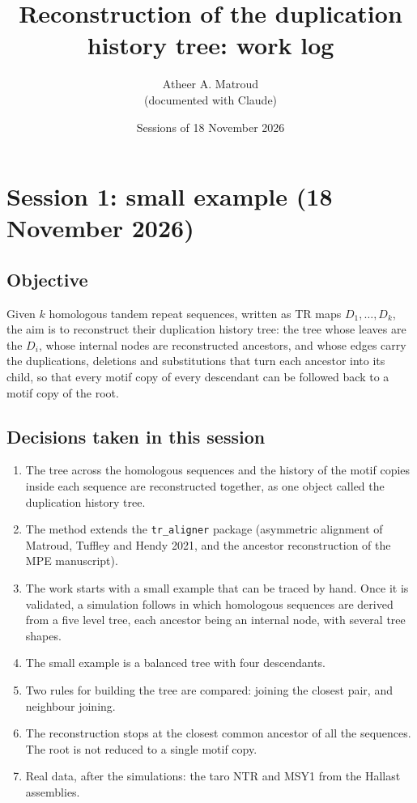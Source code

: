 \documentclass[11pt,a4paper]{article}
\title{Reconstruction of the duplication history tree: work log}
\author{Atheer A. Matroud\\ \small (documented with Claude)}
\date{Sessions of 18 November 2026}
\begin{document}
\maketitle

\section{Session 1: small example (18 November 2026)}

\subsection{Objective}
Given $k$ homologous tandem repeat sequences, written as TR maps $D_1,\ldots,D_k$, the aim is to
reconstruct their duplication history tree: the tree whose leaves are the $D_i$, whose internal
nodes are reconstructed ancestors, and whose edges carry the duplications, deletions and
substitutions that turn each ancestor into its child, so that every motif copy of every
descendant can be followed back to a motif copy of the root.

\subsection{Decisions taken in this session}
\begin{enumerate}
\item The tree across the homologous sequences and the history of the motif copies inside each
  sequence are reconstructed together, as one object called the duplication history tree.
\item The method extends the \texttt{tr\_aligner} package (asymmetric alignment of Matroud,
  Tuffley and Hendy 2021, and the ancestor reconstruction of the MPE manuscript).
\item The work starts with a small example that can be traced by hand. Once it is validated, a
  simulation follows in which homologous sequences are derived from a five level tree, each
  ancestor being an internal node, with several tree shapes.
\item The small example is a balanced tree with four descendants.
\item Two rules for building the tree are compared: joining the closest pair, and neighbour
  joining.
\item The reconstruction stops at the closest common ancestor of all the sequences. The root is
  not reduced to a single motif copy.
\item Real data, after the simulations: the taro NTR and MSY1 from the Hallast assemblies.
\end{enumerate}
\end{document}
